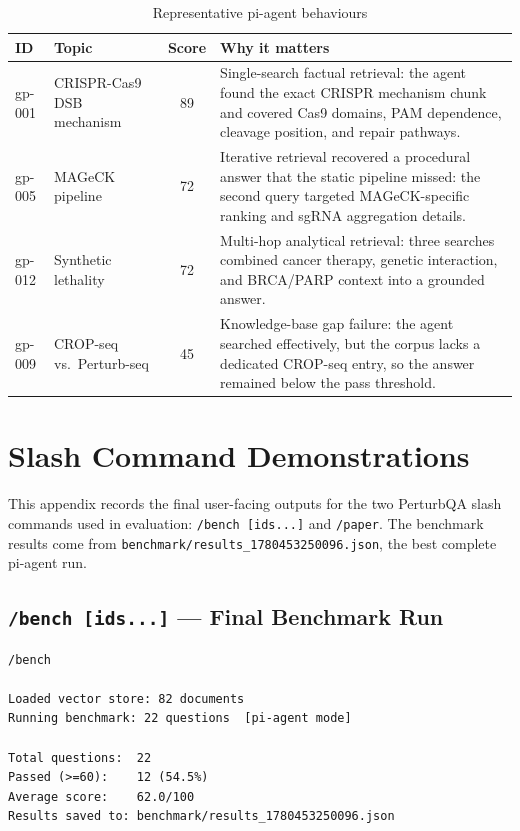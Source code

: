 \documentclass[12pt, a4paper]{article}
\begin{document}
\begin{table}[ht]
\centering
\caption{Representative pi-agent behaviours}
\begin{tabularx}{\textwidth}{llcX}
\toprule
\textbf{ID} & \textbf{Topic} & \textbf{Score} & \textbf{Why it matters} \\
\midrule
gp-001 & CRISPR-Cas9 DSB mechanism & 89 &
Single-search factual retrieval: the agent found the exact CRISPR mechanism chunk and
covered Cas9 domains, PAM dependence, cleavage position, and repair pathways. \\

gp-005 & MAGeCK pipeline & 72 &
Iterative retrieval recovered a procedural answer that the static pipeline missed:
the second query targeted MAGeCK-specific ranking and sgRNA aggregation details. \\

gp-012 & Synthetic lethality & 72 &
Multi-hop analytical retrieval: three searches combined cancer therapy, genetic
interaction, and BRCA/PARP context into a grounded answer. \\

gp-009 & CROP-seq vs.\ Perturb-seq & 45 &
Knowledge-base gap failure: the agent searched effectively, but the corpus lacks a
dedicated CROP-seq entry, so the answer remained below the pass threshold. \\
\bottomrule
\end{tabularx}
\end{table}


\section{Slash Command Demonstrations}
\label{app:slash-commands}

This appendix records the final user-facing outputs for the two PerturbQA slash commands
used in evaluation: \texttt{/bench [ids...]} and \texttt{/paper}. The benchmark results
come from \texttt{benchmark/results\_1780453250096.json}, the best complete pi-agent run.

\subsection{\texttt{/bench [ids...]} --- Final Benchmark Run}

\begin{lstlisting}[numbers=none]
/bench

Loaded vector store: 82 documents
Running benchmark: 22 questions  [pi-agent mode]

Total questions:  22
Passed (>=60):    12 (54.5%)
Average score:    62.0/100
Results saved to: benchmark/results_1780453250096.json
\end{lstlisting}
\end{document}
